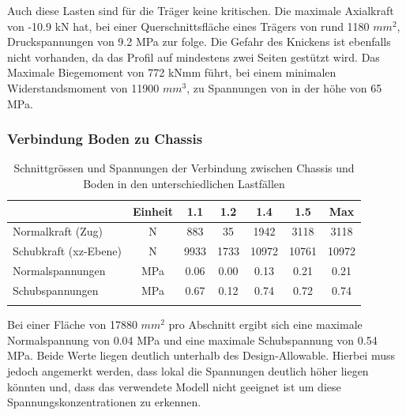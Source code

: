 Auch diese Lasten sind für die Träger keine kritischen. Die maximale Axialkraft von -10.9 kN hat, bei einer Querschnittsfläche eines Trägers von rund 1180 $mm^2$, Druckspannungen von 9.2 MPa zur folge. Die Gefahr des Knickens ist ebenfalls nicht vorhanden, da das Profil auf mindestens zwei Seiten gestützt wird. Das Maximale Biegemoment von 772 kNmm führt, bei einem minimalen Widerstandsmoment von 11900 $mm^3$, zu Spannungen von in der höhe von 65 MPa.



\subsubsection{Verbindung Boden zu Chassis}

\begin{table}[H]
\centering
\begin{tabular}{lcccccc}
\thickhline
&	Einheit	&	1.1	&	1.2	&	1.4	&	1.5	&	Max	\\	\hline
Normalkraft (Zug)	&	N	&	883	&	35	&	1942	&	3118	&	3118	\\
Schubkraft (xz-Ebene)	&	N	&	9933	&	1733	&	10972	&	10761	&	10972	\\	\hline
Normalspannungen	&	MPa	&	0.06	&	0.00	&	0.13	&	0.21	&	0.21	\\
Schubspannungen	&	MPa	&	0.67	&	0.12	&	0.74	&	0.72	&	0.74	\\	\thickhline
\end{tabular}
\caption{Schnittgrössen und Spannungen der Verbindung zwischen Chassis und Boden in den unterschiedlichen Lastfällen}
\label{tab:FEMres Boden}
\end{table}

Bei einer Fläche von 17880 $mm^2$ pro Abschnitt ergibt sich eine maximale Normalspannung von 0.04 MPa und eine maximale Schubspannung von 0.54 MPa. Beide Werte liegen deutlich unterhalb des Design-Allowable. Hierbei muss jedoch angemerkt werden, dass lokal die Spannungen deutlich höher liegen könnten und, dass das verwendete Modell nicht geeignet ist um diese Spannungskonzentrationen zu erkennen.

